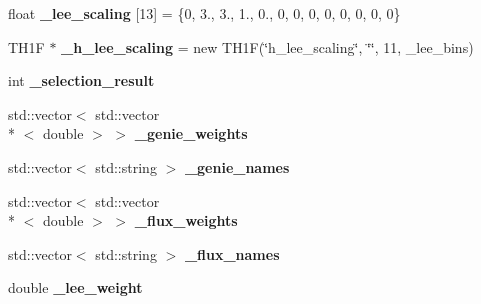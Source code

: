 \begin{DoxyCompactItemize}
\item 
\hypertarget{classlee_1_1ElectronNeutrinoFilter_a3c12458489f044717ce4acbb46ec8a5c}{float {\bfseries \-\_\-lee\-\_\-scaling} \mbox{[}13\mbox{]} = \{0, 3., 3., 1., 0., 0, 0, 0, 0, 0, 0, 0, 0\}}\label{classlee_1_1ElectronNeutrinoFilter_a3c12458489f044717ce4acbb46ec8a5c}

\item 
\hypertarget{classlee_1_1ElectronNeutrinoFilter_a4603c127eb117ed2e1cb0cc2f9ab8305}{T\-H1\-F $\ast$ {\bfseries \-\_\-h\-\_\-lee\-\_\-scaling} = new T\-H1\-F(\char`\"{}h\-\_\-lee\-\_\-scaling\char`\"{}, \char`\"{}\char`\"{}, 11, \-\_\-lee\-\_\-bins)}\label{classlee_1_1ElectronNeutrinoFilter_a4603c127eb117ed2e1cb0cc2f9ab8305}

\item 
\hypertarget{classlee_1_1ElectronNeutrinoFilter_a386b3c75cf0868c065e214638b7b6895}{int {\bfseries \-\_\-selection\-\_\-result}}\label{classlee_1_1ElectronNeutrinoFilter_a386b3c75cf0868c065e214638b7b6895}

\item 
\hypertarget{classlee_1_1ElectronNeutrinoFilter_a6abef7f23db8328cf5016a6ac72972db}{std\-::vector$<$ std\-::vector\\*
$<$ double $>$ $>$ {\bfseries \-\_\-genie\-\_\-weights}}\label{classlee_1_1ElectronNeutrinoFilter_a6abef7f23db8328cf5016a6ac72972db}

\item 
\hypertarget{classlee_1_1ElectronNeutrinoFilter_a541c8b54ac46ebb7c57f54ac7e556d9e}{std\-::vector$<$ std\-::string $>$ {\bfseries \-\_\-genie\-\_\-names}}\label{classlee_1_1ElectronNeutrinoFilter_a541c8b54ac46ebb7c57f54ac7e556d9e}

\item 
\hypertarget{classlee_1_1ElectronNeutrinoFilter_ace42288472567729112b53b06243e5ee}{std\-::vector$<$ std\-::vector\\*
$<$ double $>$ $>$ {\bfseries \-\_\-flux\-\_\-weights}}\label{classlee_1_1ElectronNeutrinoFilter_ace42288472567729112b53b06243e5ee}

\item 
\hypertarget{classlee_1_1ElectronNeutrinoFilter_a18b30bd6d0c4a220c122055392a11fc5}{std\-::vector$<$ std\-::string $>$ {\bfseries \-\_\-flux\-\_\-names}}\label{classlee_1_1ElectronNeutrinoFilter_a18b30bd6d0c4a220c122055392a11fc5}

\item 
\hypertarget{classlee_1_1ElectronNeutrinoFilter_a709a8b99dfeeecb1bcfa257b68720668}{double {\bfseries \-\_\-lee\-\_\-weight}}\label{classlee_1_1ElectronNeutrinoFilter_a709a8b99dfeeecb1bcfa257b68720668}


\end{DoxyCompactItemize}
